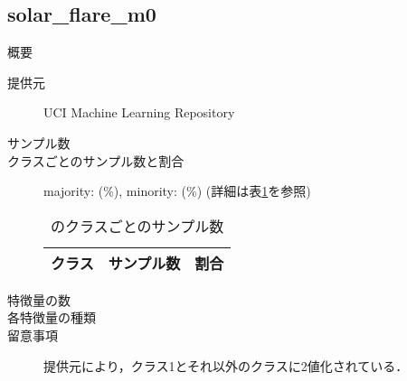 \subsection{solar\_flare\_m0}
\begin{description}
    \item[概要] \cite{}
    \item[提供元] UCI Machine Learning Repository
    \item[サンプル数] 
    \item[クラスごとのサンプル数と割合] majority:  (\%), minority:  (\%) (詳細は表\ref{tab:}を参照)

        \begin{table}
            \centering
            \caption{のクラスごとのサンプル数}
            \label{tab:}
            \begin{tabular}{lrc} \hline
                \multicolumn{1}{c}{クラス}&
                \multicolumn{1}{c}{サンプル数}&
                \multicolumn{1}{c}{割合}\\
                \hline
                \hline

                \hline
            \end{tabular}
        \end{table}

    \item[特徴量の数] 
    \item[各特徴量の種類] \mbox{}
        
    \item[留意事項] 提供元により，クラス1とそれ以外のクラスに2値化されている．
\end{description}


